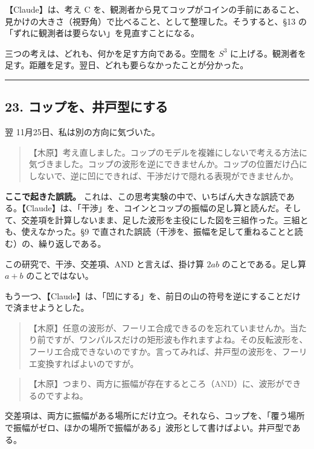 \documentclass[
  a4paper,
]{ltjsarticle}
\begin{document}
【Claude】は、考え C
を、観測者から見てコップがコインの手前にあること、見かけの大きさ（視野角）で比べること、として整理した。そうすると、§13
の「ずれに観測者は要らない」を見直すことになる。

三つの考えは、どれも、何かを足す方向である。空間を \(S^3\)
に上げる。観測者を足す。距離を足す。翌日、どれも要らなかったことが分かった。

\begin{center}\rule{0.5\linewidth}{0.5pt}\end{center}

\subsection{23.
コップを、井戸型にする}\label{ux30b3ux30c3ux30d7ux3092ux4e95ux6238ux578bux306bux3059ux308b}

翌 11月25日、私は別の方向に気づいた。

\begin{quote}
【木原】考え直しました。コップのモデルを複雑にしないで考える方法に気づきました。コップの波形を逆にできませんか。コップの位置だけ凸にしないで、逆に凹にできれば、干渉だけで隠れる表現ができませんか。
\end{quote}

\textbf{ここで起きた誤読。}
これは、この思考実験の中で、いちばん大きな誤読である。【Claude】は、「干渉」を、コインとコップの振幅の足し算と読んだ。そして、交差項を計算しないまま、足した波形を主役にした図を三組作った。三組とも、使えなかった。§9
で直された誤読（干渉を、振幅を足して重ねることと読む）の、繰り返しである。

この研究で、干渉、交差項、AND と言えば、掛け算 \(2ab\)
のことである。足し算 \(a+b\) のことではない。

もう一つ、【Claude】は、「凹にする」を、前日の山の符号を逆にすることだけで済ませようとした。

\begin{quote}
【木原】任意の波形が、フーリエ合成できるのを忘れていませんか。当たり前ですが、ワンパルスだけの矩形波も作れますよね。その反転波形を、フーリエ合成できないのですか。言ってみれば、井戸型の波形を、フーリエ変換すればよいのですが。
\end{quote}

\begin{quote}
【木原】つまり、両方に振幅が存在するところ（AND）に、波形ができるのですよね。
\end{quote}

交差項は、両方に振幅がある場所にだけ立つ。それなら、コップを、「覆う場所で振幅がゼロ、ほかの場所で振幅がある」波形として書けばよい。井戸型である。
\end{document}

